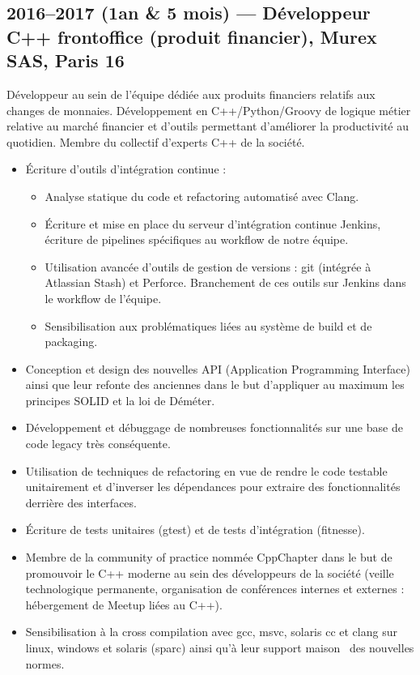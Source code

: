 \documentclass[11pt,a4paper,sans]{article} %
\begin{document}
\subsection{2016--2017 (1an \& 5 mois) --- Développeur C++ frontoffice (produit financier), Murex SAS, Paris 16}

Développeur au sein de l'équipe dédiée aux produits financiers relatifs aux changes de monnaies. Développement en
C++/Python/Groovy de logique métier relative au marché financier et d'outils permettant d'améliorer la productivité au
quotidien. Membre du collectif d'experts C++ de la société.
\begin{itemize}
  \item Écriture d'outils d'intégration continue :
        \begin{itemize}
          \item Analyse statique du code et refactoring automatisé avec Clang.
          \item Écriture et mise en place du serveur d'intégration continue Jenkins, écriture de pipelines spécifiques
                au workflow de notre équipe.
          \item Utilisation avancée d'outils de gestion de versions : git (intégrée à Atlassian Stash) et Perforce.
                Branchement de ces outils sur Jenkins dans le workflow de l'équipe.
          \item Sensibilisation aux problématiques liées au système de build et de packaging.
        \end{itemize}
  \item Conception et design des nouvelles API (Application Programming Interface) ainsi que leur refonte des anciennes
        dans le but d'appliquer au maximum les principes SOLID et la loi de Déméter.
  \item Développement et débuggage de nombreuses fonctionnalités sur une base de code legacy très conséquente.
  \item Utilisation de techniques de refactoring en vue de rendre le code testable unitairement et d'inverser les
        dépendances pour extraire des fonctionnalités derrière des interfaces.
  \item Écriture de tests unitaires (gtest) et de tests d'intégration (fitnesse).
  \item Membre de la \og community of practice \fg nommée CppChapter dans le but de promouvoir le C++ moderne au sein
        des développeurs de la société (veille technologique permanente, organisation de conférences internes et
        externes : hébergement de Meetup liées au C++).
  \item Sensibilisation à la cross compilation avec gcc, msvc, solaris cc et clang sur linux, windows et solaris (sparc)
        ainsi qu'à leur support \og maison \fg ~des nouvelles normes.
\end{itemize}
\end{document}

